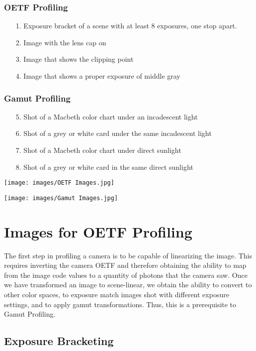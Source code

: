 \documentclass[twoside]{article}
\begin{document}
\subsubsection*{OETF Profiling}
\begin{enumerate}
    \item[1.] Exposure bracket of a scene with at least 8 exposures, one stop apart.
    \item[2.] Image with the lens cap on
    \item[3.] Image that shows the clipping point
    \item[4.] Image that shows a proper exposure of middle gray
\end{enumerate}

\subsubsection*{Gamut Profiling}
\begin{enumerate}
    \item[5.] Shot of a Macbeth color chart under an incadescent light
    \item[6.] Shot of a grey or white card under the same incadescent light
    \item[7.] Shot of a Macbeth color chart under direct sunlight
    \item[8.] Shot of a grey or white card in the same direct sunlight
\end{enumerate}

\newpage
\texttt{[image: images/OETF Images.jpg]}

\texttt{[image: images/Gamut Images.jpg]}

\newpage
\newpage\section{Images for OETF Profiling}
The first step in profiling a camera is to be capable of linearizing the image. This requires inverting the camera OETF and therefore obtaining the ability to map from the image code values to a quantity of photons that the camera saw. Once we have transformed an image to scene-linear, we obtain the ability to convert to other color spaces, to exposure match images shot with different exposure settings, and to apply gamut transformations. Thus, this is a prerequisite to Gamut Profiling. \\

\subsection{Exposure Bracketing}
\end{document}
